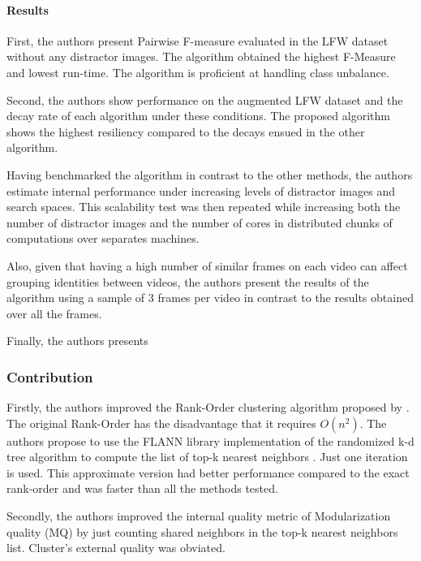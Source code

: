 \documentclass[17pt,]{extarticle}
\let\oldparagraph\paragraph
\renewcommand{\paragraph}[1]{\oldparagraph{#1}\mbox{}}
\begin{document}
\normalsize

\hypertarget{results}{%
\paragraph{Results}\label{results}}

First, the authors present Pairwise F-measure evaluated in the LFW dataset without any distractor images. The algorithm obtained the highest F-Measure and lowest run-time. The algorithm is proficient at handling class unbalance.

Second, the authors show performance on the augmented LFW dataset and the decay rate of each algorithm under these conditions. The proposed algorithm shows the highest resiliency compared to the decays ensued in the other algorithm.

Having benchmarked the algorithm in contrast to the other methods, the authors estimate internal performance under increasing levels of distractor images and search spaces. This scalability test was then repeated while increasing both the number of distractor images and the number of cores in distributed chunks of computations over separates machines.

Also, given that having a high number of similar frames on each video can affect grouping identities between videos, the authors present the results of the algorithm using a sample of 3 frames per video in contrast to the results obtained over all the frames.

Finally, the authors presents

\hypertarget{contribution}{%
\subsubsection{Contribution}\label{contribution}}

Firstly, the authors improved the Rank-Order clustering algorithm proposed by \autocite{zhu2011}. The original Rank-Order has the disadvantage that it requires \(O(n^2)\). The authors propose to use the FLANN library implementation of the randomized k-d tree algorithm to compute the list of top-k nearest neighbors \autocite{hartley2008}. Just one iteration is used. This approximate version had better performance compared to the exact rank-order and was faster than all the methods tested.

Secondly, the authors improved the internal quality metric of Modularization quality (MQ) \autocite{mancoridis1998} by just counting shared neighbors in the top-k nearest neighbors list. Cluster's external quality was obviated.
\end{document}
